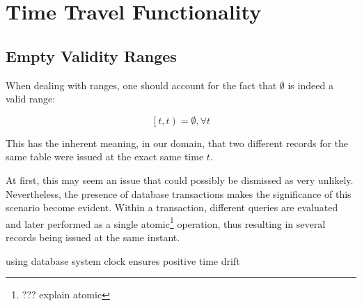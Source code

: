 \chapter{Time Travel Functionality}
\label{ch:timetravel}

%	



\section{Empty Validity Ranges}

When dealing with ranges, one should account for the fact that $\emptyset$ is indeed a valid range:

$$
\left[t, t\right) = \emptyset, \forall t
$$

This has the inherent meaning, in our domain, that two different records for the same table were issued at the exact same time $t$.

At first, this may seem an issue that could possibly be dismissed as very unlikely.
Nevertheless, the presence of database transactions makes the significance of this scenario become evident.
Within a transaction, different queries are evaluated and later performed as a single atomic\footnote{??? explain atomic} operation, thus resulting in several records being issued at the same instant.

using database system clock ensures positive time drift

